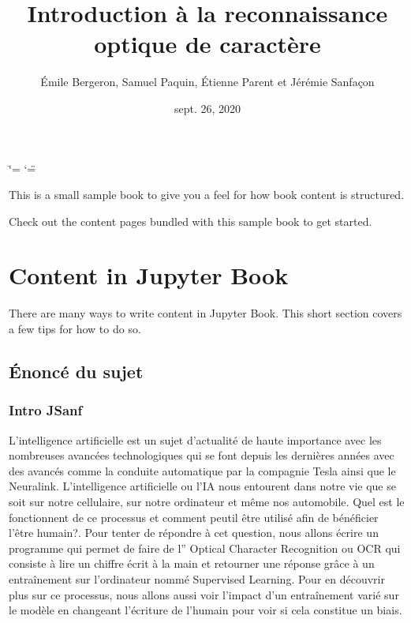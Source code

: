 \documentclass[letterpaper,10pt,french]{sphinxmanual}
\title{Introduction à la reconnaissance optique de caractère}
\date{sept. 26, 2020}
\author{Émile Bergeron, Samuel Paquin, Étienne Parent et Jérémie Sanfaçon}
\begin{document}
\ifdefined\shorthandoff
  \ifnum\catcode`\=\string=\active\shorthandoff{=}\fi
  \ifnum\catcode`\"=\active{}\fi
\fi

\pagestyle{empty}
\sphinxmaketitle
\pagestyle{plain}
\sphinxtableofcontents
\pagestyle{normal}
\label{\detokenize{intro::doc}}


This is a small sample book to give you a feel for how book content is
structured.

Check out the content pages bundled with this sample book to get started.


\chapter{Content in Jupyter Book}
\label{\detokenize{rapport_preliminaire:content-in-jupyter-book}}\label{\detokenize{rapport_preliminaire::doc}}
There are many ways to write content in Jupyter Book. This short section
covers a few tips for how to do so.


\section{Énoncé du sujet}
\label{\detokenize{enonce_sujet:enonce-du-sujet}}\label{\detokenize{enonce_sujet::doc}}

\subsection{Intro JSanf}
\label{\detokenize{enonce_sujet:intro-jsanf}}
L’intelligence artificielle est un sujet d’actualité de haute importance avec les
nombreuses avancées
technologiques qui se font depuis les dernières années avec des avancés comme la
conduite automatique
par la compagnie Tesla ainsi que le Neuralink. L’intelligence artificielle ou
l’IA nous entourent
dans notre vie que se soit sur notre cellulaire, sur notre ordinateur et même nos automobile.
Quel est le fonctionnent de ce processus et comment peut\sphinxhyphen{}il être utilisé afin de
bénéficier l’être humain?. Pour tenter de répondre à cet question, nous allons
écrire un programme qui permet de faire de l” Optical Character Recognition ou OCR
qui consiste à lire un chiffre écrit à la main et retourner une réponse grâce à
un entraînement sur l’ordinateur nommé Supervised Learning. Pour en découvrir
plus sur ce processus, nous allons aussi voir l’impact d’un entraînement varié
sur le modèle en changeant l’écriture de l’humain pour voir si cela constitue un
biais.
\end{document}

